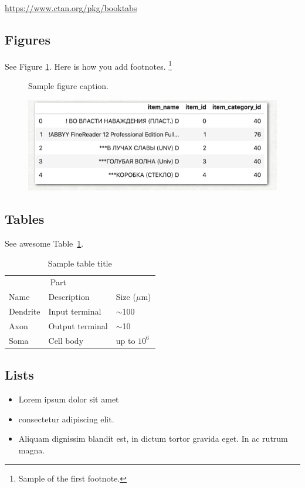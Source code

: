\documentclass{article}
\begin{document}
\begin{center}
	\url{https://www.ctan.org/pkg/booktabs}
\end{center}


\subsection{Figures}
\lipsum[10]
See Figure \ref{fig:fig1}. Here is how you add footnotes. \footnote{Sample of the first footnote.}
\lipsum[11]

\begin{figure}
	\centering
	\fbox{\rule[-.5cm]{4cm}{4cm} \rule[-.5cm]{4cm}{0cm}}
	\caption{Sample figure caption.}
	\label{fig:fig1}
\end{figure}

\begin{figure} %
	\centering
	\includegraphics{test.png}
\end{figure}

\subsection{Tables}
\lipsum[12]
See awesome Table~\ref{tab:table}.

\begin{table}
	\caption{Sample table title}
	\centering
	\begin{tabular}{lll}
		\toprule
		\multicolumn{2}{c}{Part}                   \\
		\cmidrule(r){1-2}
		Name     & Description     & Size ($\mu$m) \\
		\midrule
		Dendrite & Input terminal  & $\sim$100     \\
		Axon     & Output terminal & $\sim$10      \\
		Soma     & Cell body       & up to $10^6$  \\
		\bottomrule
	\end{tabular}
	\label{tab:table}
\end{table}

\subsection{Lists}
\begin{itemize}
	\item Lorem ipsum dolor sit amet
	\item consectetur adipiscing elit.
	\item Aliquam dignissim blandit est, in dictum tortor gravida eget. In ac rutrum magna.
\end{itemize}
\end{document}
